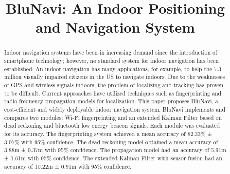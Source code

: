 \documentclass[conference]{IEEEtran}
\begin{document}
\title{BluNavi: An Indoor Positioning and Navigation System}

\author{
\and
{}
\and
{}
}

\maketitle

\begin{abstract}

Indoor navigation systems have been in increasing demand since the introduction of smartphone technology; however, no standard system for indoor navigation has been established. An indoor navigation has many applications, for example, to help the 7.3 million visually impaired citizens in the US to navigate indoors. Due to the weaknesses of GPS and wireless signals indoors, the problem of localizing and tracking has proven to be difficult. Current approaches have utilized techniques such as fingerprinting and radio frequency propagation models for localization. This paper proposes BluNavi, a cost-efficient and widely deployable indoor navigation system. BluNavi implements and compares two modules: Wi-Fi fingerprinting and an extended Kalman Filter based on dead reckoning and bluetooth low energy beacon signals. Each module was evaluated for its accuracy. The fingerprinting system achieved a mean accuracy of 82.33\% ± 3.07\% with 95\% confidence. The dead reckoning model obtained a mean accuracy of 3.88m ± 0.37m with 95\% confidence. The propagation model had an accuracy of 5.91m ± 1.61m with 95\% confidence. The extended Kalman Filter with sensor fusion had an accuracy of 10.22m ± 0.91m with 95\% confidence.

\end{abstract}
\end{document}
